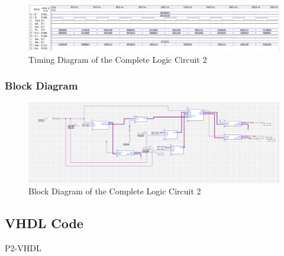     \begin{figure}[H]
        \centering
        \includegraphics[width=15cm]{Pictures/ALU2WaveForm.png}
        \caption{{Timing Diagram of the Complete Logic Circuit 2}}
        \label{FSM}
    \end{figure}

    \subsubsection{{Block Diagram}}

        \begin{figure}[H]
            \centering
            \includegraphics[width=15cm]{Pictures/P12BlockDia.png}
            \caption{{Block Diagram of the Complete Logic Circuit 2}}
            \label{FSM}
        \end{figure}


\subsection{{VHDL Code}}

    {P2-VHDL}

